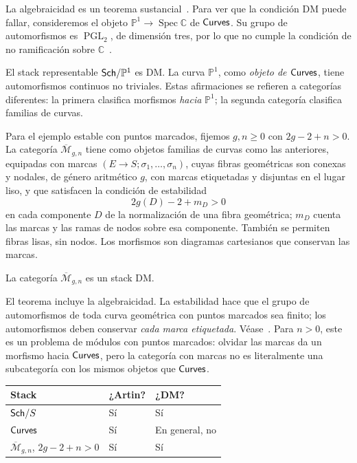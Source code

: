 \documentclass[12pt,openany]{memoir}
\begin{document}
La algebraicidad es un teorema sustancial~\cite{sp:curves}. Para ver que
la condición DM puede fallar, consideremos el objeto
\(\mathbb P^1\to\operatorname{Spec}\mathbb C\) de \(\mathsf{Curves}\).
Su grupo de automorfismos es \(\operatorname{PGL}_2\), de dimensión
tres, por lo que no cumple la condición de no ramificación sobre
\(\mathbb C\)~\cite{sp:curve-aut}.

\begin{ptcb}
El stack representable \(\mathsf{Sch}/\mathbb P^1\) es DM.
La curva \(\mathbb P^1\), como \emph{objeto de \(\mathsf{Curves}\)}, tiene
automorfismos continuos no triviales. Estas afirmaciones se refieren a
categorías diferentes: la primera clasifica morfismos \emph{hacia}
\(\mathbb P^1\); la segunda categoría clasifica familias de curvas.
\end{ptcb}

Para el ejemplo estable con puntos marcados, fijemos \(g,n\geq0\) con
\(2g-2+n>0\). La categoría \(\overline{\mathcal M}_{g,n}\) tiene como
objetos familias de curvas como las anteriores, equipadas con marcas
\((E\to S;\sigma_1,\ldots,\sigma_n)\), cuyas fibras geométricas son
conexas y nodales, de género aritmético \(g\), con marcas etiquetadas y
disjuntas en el lugar liso, y que satisfacen la condición de estabilidad
\[
  2g(D)-2+m_D>0
\]
en cada componente \(D\) de la normalización de una fibra geométrica;
\(m_D\) cuenta las marcas y las ramas de nodos sobre esa componente.
También se permiten fibras lisas, sin nodos.
Los morfismos son diagramas cartesianos que conservan las marcas.

\begin{Th}
La categoría \(\overline{\mathcal M}_{g,n}\) es un stack DM.
\end{Th}

El teorema incluye la algebraicidad. La estabilidad hace que el grupo de
automorfismos de toda curva geométrica con puntos marcados sea finito;
los automorfismos deben conservar \emph{cada marca etiquetada}.
Véase~\cite[\S6.3 y Teorema~6.4.16]{alper}.
Para \(n>0\), este es un problema de módulos con puntos marcados:
olvidar las marcas da un morfismo hacia \(\mathsf{Curves}\), pero la categoría
con marcas no es literalmente una subcategoría con los mismos objetos
que \(\mathsf{Curves}\).

\begin{center}
\begin{tabular}{lll}
\toprule
Stack & ¿Artin? & ¿DM? \\
\midrule
\(\mathsf{Sch}/S\) & Sí & Sí \\
\(\mathsf{Curves}\) & Sí & En general, no \\
\(\overline{\mathcal M}_{g,n}\), \(2g-2+n>0\) & Sí & Sí \\
\bottomrule
\end{tabular}
\end{center}
\end{document}
